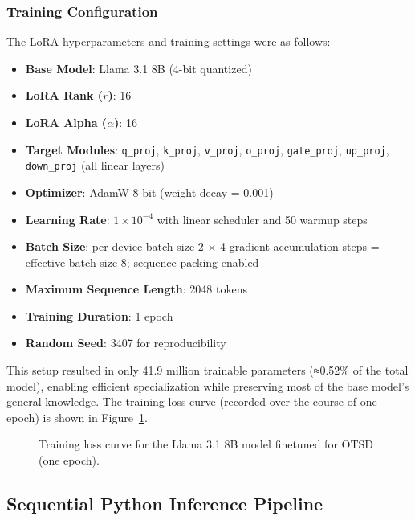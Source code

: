 \documentclass[conference]{IEEEtran}
\begin{document}
\subsubsection{Training Configuration}

The LoRA hyperparameters and training settings were as follows:

\begin{itemize}
    \item \textbf{Base Model}: Llama 3.1 8B (4-bit quantized)
    \item \textbf{LoRA Rank ($r$)}: 16
    \item \textbf{LoRA Alpha ($\alpha$)}: 16
    \item \textbf{Target Modules}: \texttt{q\_proj}, \texttt{k\_proj}, \texttt{v\_proj}, \texttt{o\_proj}, \texttt{gate\_proj}, \texttt{up\_proj}, \texttt{down\_proj} (all linear layers)
    \item \textbf{Optimizer}: AdamW 8-bit (weight decay = 0.001)
    \item \textbf{Learning Rate}: $1 \times 10^{-4}$ with linear scheduler and 50 warmup steps
    \item \textbf{Batch Size}: per-device batch size 2 $\times$ 4 gradient accumulation steps = effective batch size 8; sequence packing enabled
    \item \textbf{Maximum Sequence Length}: 2048 tokens
    \item \textbf{Training Duration}: 1 epoch
    \item \textbf{Random Seed}: 3407 for reproducibility
\end{itemize}

This setup resulted in only 41.9 million trainable parameters (≈0.52\% of the total model), enabling efficient specialization while preserving most of the base model's general knowledge. The training loss curve (recorded over the course of one epoch) is shown in Figure~\ref{fig:training_loss}.

\begin{figure}[htbp]
\centering

\caption{Training loss curve for the Llama 3.1 8B model finetuned for OTSD (one epoch).}
\label{fig:training_loss}
\end{figure}

\subsection{Sequential Python Inference Pipeline}
\end{document}
